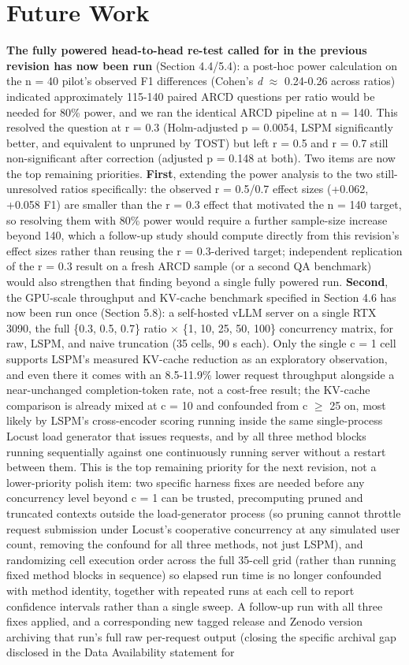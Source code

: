 \section{Future Work}
\textbf{The fully powered head-to-head re-test called for in the previous revision has now been run} (Section 4.4/5.4): a post-hoc power calculation on the n = 40 pilot's observed F1 differences (Cohen's \textit{d} $\approx$ 0.24-0.26 across ratios) indicated approximately 115-140 paired ARCD questions per ratio would be needed for 80\% power, and we ran the identical ARCD pipeline at n = 140. This resolved the question at r = 0.3 (Holm-adjusted p = 0.0054, LSPM significantly better, and equivalent to unpruned by TOST) but left r = 0.5 and r = 0.7 still non-significant after correction (adjusted p = 0.148 at both). Two items are now the top remaining priorities. \textbf{First}, extending the power analysis to the two still-unresolved ratios specifically: the observed r = 0.5/0.7 effect sizes (+0.062, +0.058 F1) are smaller than the r = 0.3 effect that motivated the n = 140 target, so resolving them with 80\% power would require a further sample-size increase beyond 140, which a follow-up study should compute directly from this revision's effect sizes rather than reusing the r = 0.3-derived target; independent replication of the r = 0.3 result on a fresh ARCD sample (or a second QA benchmark) would also strengthen that finding beyond a single fully powered run. \textbf{Second}, the GPU-scale throughput and KV-cache benchmark specified in Section 4.6 has now been run once (Section 5.8): a self-hosted vLLM server on a single RTX 3090, the full \{0.3, 0.5, 0.7\} ratio $\times$ \{1, 10, 25, 50, 100\} concurrency matrix, for raw, LSPM, and naive truncation (35 cells, 90 s each). Only the single c = 1 cell supports LSPM's measured KV-cache reduction as an exploratory observation, and even there it comes with an 8.5-11.9\% lower request throughput alongside a near-unchanged completion-token rate, not a cost-free result; the KV-cache comparison is already mixed at c = 10 and confounded from c $\geq$ 25 on, most likely by LSPM's cross-encoder scoring running inside the same single-process Locust load generator that issues requests, and by all three method blocks running sequentially against one continuously running server without a restart between them. This is the top remaining priority for the next revision, not a lower-priority polish item: two specific harness fixes are needed before any concurrency level beyond c = 1 can be trusted, precomputing pruned and truncated contexts outside the load-generator process (so pruning cannot throttle request submission under Locust's cooperative concurrency at any simulated user count, removing the confound for all three methods, not just LSPM), and randomizing cell execution order across the full 35-cell grid (rather than running fixed method blocks in sequence) so elapsed run time is no longer confounded with method identity, together with repeated runs at each cell to report confidence intervals rather than a single sweep. A follow-up run with all three fixes applied, and a corresponding new tagged release and Zenodo version archiving that run's full raw per-request output (closing the specific archival gap disclosed in the Data Availability statement for 